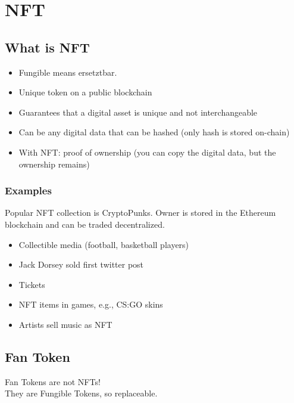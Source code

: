 \section{NFT}
\subsection{What is NFT}
\begin{itemize}
  \item Fungible means ersetztbar.
  \item Unique token on a public blockchain
  \item Guarantees that a digital asset is unique and not interchangeable
  \item Can be any digital data that can be hashed (only hash is stored on-chain)
  \item With NFT: proof of ownership (you can copy the digital data, but the ownership remains)
\end{itemize}

\subsubsection{Examples}
Popular NFT collection is CryptoPunks.
Owner is stored in the Ethereum blockchain and can be traded decentralized.

\begin{itemize}
  \item Collectible media (football, basketball players)
  \item Jack Dorsey sold first twitter post
  \item Tickets
  \item NFT items in games, e.g., CS:GO skins
  \item Artists sell music as NFT
\end{itemize}

\subsection{Fan Token}
Fan Tokens are not NFTs!\\
They are Fungible Tokens, so replaceable.

